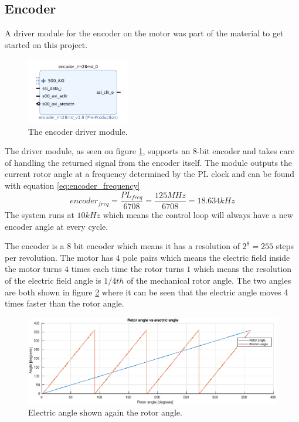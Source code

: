 \subsection{Encoder}

A driver module for the encoder on the motor was part of the material to get started on this project. 

\begin{figure}[H]
	\centering
	\includegraphics[width=0.4\textwidth]{pictures/software/encoder_module.png}
	\caption{The encoder driver module.}
	\label{fig:encoder_module}
\end{figure}
The driver module, as seen on figure \ref{fig:encoder_module}, supports an 8-bit encoder and takes care of handling the returned signal from the encoder itself. The module outputs the current rotor angle at a frequency determined by the PL clock and can be found with equation \ref{eq:encoder_frequency}
\begin{equation}
encoder_{freq} = \frac{PL_{freq}}{6708} = \frac{125MHz}{6708} = 18.634kHz
\label{eq:encoder_frequency}
\end{equation}
The system runs at $10kHz$ which means the control loop will always have a new encoder angle at every cycle.


The encoder is a 8 bit encoder which means it has a resolution of $2^8 = 255$ steps per revolution. The motor has $4$ pole pairs which means the electric field inside the motor turns $4$ times each time the rotor turns $1$ which means the resolution of the electric field angle is $1/4th$ of the mechanical rotor angle.
The two angles are both shown in figure \ref{fig:rotor_vs_electric_angle} where it can be seen that the electric angle moves 4 times faster than the rotor angle.

\begin{figure}[H]
	\centering
	\includegraphics[width=1\textwidth]{pictures/software/rotor_vs_electric_angle.eps}
	\caption{Electric angle shown again the rotor angle.}
	\label{fig:rotor_vs_electric_angle}
\end{figure}

